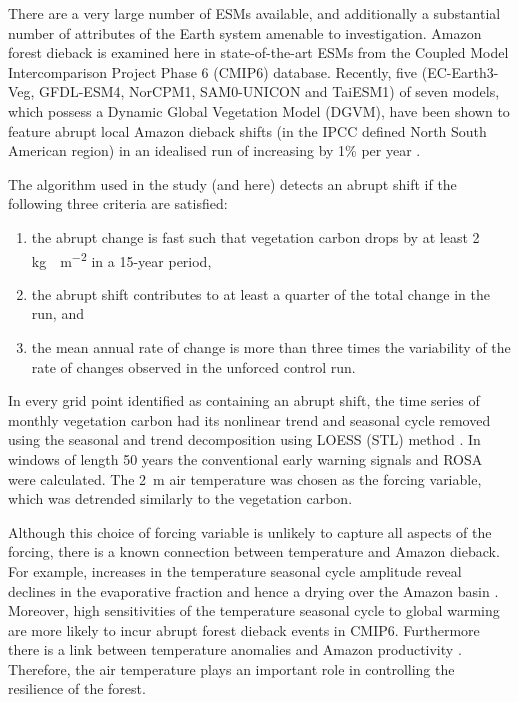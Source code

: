 There are a very large number of ESMs available, and additionally a substantial number of attributes of the Earth system amenable to investigation. Amazon forest dieback is
examined here in state-of-the-art ESMs from the Coupled Model Intercomparison  Project Phase 6 (CMIP6) \parencite{Eyring2016} database. Recently,
five (EC-Earth3-Veg, GFDL-ESM4, NorCPM1, SAM0-UNICON and TaiESM1) of seven models, which possess a Dynamic Global Vegetation Model
(DGVM), have been shown to feature abrupt local Amazon dieback shifts (in the IPCC defined North South American region) in an idealised run
of increasing  by 1\% per year \parencite{Parry2022}.

The algorithm used in the study (and here) detects an abrupt shift if the following three criteria are satisfied:
\begin{enumerate}
\item the abrupt change is fast such that vegetation carbon drops by at least 2 \si{\kilogram\carbon\per\meter\squared} in a 15-year period,
\item the abrupt shift contributes to at least a quarter of the total change in the run, and
\item the mean annual rate of change is more than three times the variability of the rate of changes observed in the unforced control run. 
\end{enumerate}
In every grid point identified as containing an abrupt shift, the time series of monthly vegetation carbon had its nonlinear trend and seasonal cycle removed
using the seasonal and trend decomposition using
LOESS (STL) method \parencite{Cleaveland1990}. In 
windows of length 50 years the conventional early warning signals and ROSA were calculated.
The \si{2\meter} air temperature  was chosen as the forcing variable, which
was detrended similarly to the vegetation carbon. 

Although this choice of forcing variable is unlikely to capture all aspects
of the forcing, there is a known connection between temperature and Amazon 
dieback. For example, increases in the temperature seasonal cycle amplitude reveal declines in the evaporative fraction and hence a drying over the Amazon basin \parencite{Ritchie2022}.
Moreover, high sensitivities of the temperature seasonal cycle to global warming are more likely to incur abrupt forest dieback events \parencite{Parry2022} in CMIP6.
Furthermore there is a link between temperature anomalies and Amazon productivity \parencite{Boulton2013}.
Therefore, the air temperature plays an important role in controlling the resilience of the forest.

